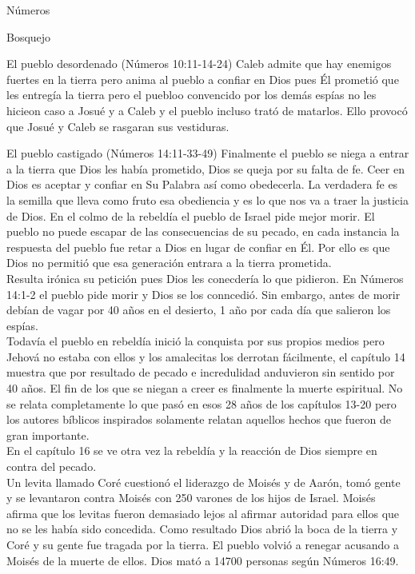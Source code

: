 \begin{section}{Números}
\begin{subsection}{Bosquejo}
\begin{subsubsection}{El pueblo desordenado (Números 10:11-14-24)}
Caleb admite que hay enemigos fuertes en la tierra pero anima al pueblo a confiar en Dios pues Él prometió que les entregía la tierra pero el puebloo convencido por los demás espías no les hicieon caso a Josué y a Caleb y el pueblo incluso trató de matarlos. Ello provocó que Josué y Caleb se rasgaran sus vestiduras.
		\end{subsubsection}
		\begin{subsubsection}{El pueblo castigado (Números 14:11-33-49)}
			Finalmente el pueblo se niega a entrar a la tierra que Dios les había prometido, Dios se queja por su falta de fe. Ceer en Dios es aceptar y confiar en Su Palabra así como obedecerla. La verdadera fe es la semilla que lleva como fruto esa obediencia y es lo que nos va a traer la justicia de Dios. En el colmo de la rebeldía el pueblo de Israel pide mejor morir. El pueblo no puede escapar de las consecuencias de su pecado, en cada instancia la respuesta del pueblo fue retar a Dios en lugar de confiar en Él. Por ello es que Dios no permitió que esa generación entrara a la tierra prometida.\\
			Resulta irónica su petición pues Dios les conecdería lo que pidieron. En Números 14:1-2 el pueblo pide morir y Dios se los conncedió. Sin embargo, antes de morir debían de vagar por 40 años en el desierto, 1 año por cada día que salieron los espías.\\
			Todavía el pueblo en rebeldía inició la conquista por sus propios medios pero Jehová no estaba con ellos y los amalecitas los derrotan fácilmente, el capítulo 14 muestra que por resultado de pecado e incredulidad anduvieron sin sentido por 40 años. El fin de los que se niegan a creer es finalmente la muerte espiritual. No se relata completamente lo que pasó en esos 28 años de los capítulos 13-20 pero los autores bíblicos inspirados solamente relatan aquellos hechos que fueron de gran importante. \\
			En el capítulo 16 se ve otra vez la rebeldía y la reacción de Dios siempre en contra del pecado. \\
			Un levita llamado Coré cuestionó el liderazgo de Moisés y de Aarón, tomó gente  y se levantaron contra Moisés con 250 varones de los hijos de Israel. Moisés afirma que los levitas fueron demasiado lejos al afirmar autoridad para ellos que no se les había sido concedida. Como resultado Dios abrió la boca de la tierra y Coré y su gente fue tragada por la tierra. El pueblo volvió a renegar acusando a Moisés de la muerte de ellos. Dios mató a 14700 personas según Números 16:49.\\

\end{subsubsection}
\end{subsection}
\end{section}
